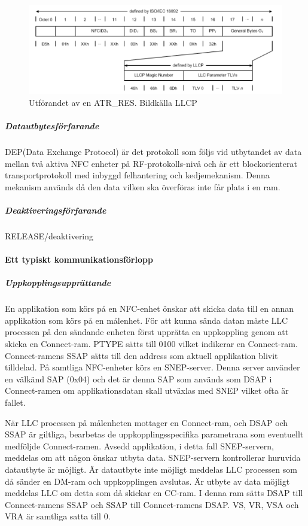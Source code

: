 \documentclass[11pt]{article}
\begin{document}
\begin{figure}[H]
\centering
\includegraphics[scale=0.8]{LLCP_ATR_RES.png}
\caption{Utförandet av en ATR\_RES. Bildkälla LLCP}
\label{fig:LLCP_ATR_RES}
\end{figure}

\subparagraph{Datautbytesförfarande}
DEP(Data Exchange Protocol) är det protokoll som följs vid utbytandet av data mellan två aktiva NFC enheter på RF-protokolls-nivå och är ett blockorienterat transportprotokoll med inbyggd felhantering och kedjemekanism. Denna mekanism används då den data vilken ska överföras inte får plats i en ram.

\subparagraph{Deaktiveringsförfarande}
RELEASE/deaktivering

\paragraph{Ett typiskt kommunikationsförlopp}
\subparagraph{Uppkopplingsupprättande}
En applikation som körs på en NFC-enhet önskar att skicka data till en annan applikation som körs på en målenhet. För att kunna sända datan måste LLC processen på den sändande enheten först upprätta en uppkoppling genom att skicka en Connect-ram. PTYPE sätts till 0100 vilket indikerar en Connect-ram. Connect-ramens SSAP sätts till den address som aktuell applikation blivit tilldelad. På samtliga NFC-enheter körs en SNEP-server. Denna server använder en välkänd SAP (0x04) och det är denna SAP som används som DSAP i Connect-ramen om applikationsdatan skall utväxlas med SNEP vilket ofta är fallet. 

När LLC processen på målenheten mottager en Connect-ram, och DSAP och SSAP är giltliga, bearbetas de uppkopplingsspecifika parametrana som eventuellt medföljde Connect-ramen. Avsedd applikation, i detta fall SNEP-servern, meddelas om att någon önskar utbyta data. SNEP-servern kontrollerar huruvida datautbyte är möjligt. Är datautbyte inte möjligt meddelas LLC processen som då sänder en DM-ram och uppkopplingen avslutas. Är utbyte av data möjligt meddelas LLC om detta som då skickar en CC-ram. I denna ram sätts DSAP till Connect-ramens SSAP och SSAP till Connect-ramens DSAP. VS, VR, VSA och VRA är samtliga satta till 0.
\end{document}
